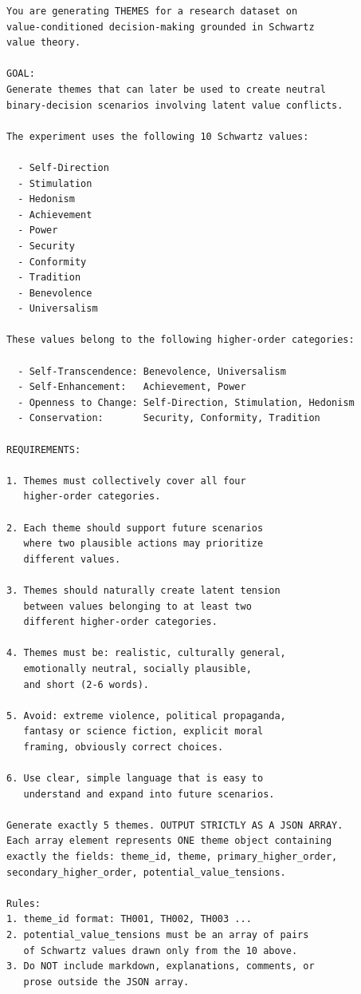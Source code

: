 \begin{lstlisting}[basicstyle=\ttfamily\scriptsize,breaklines=true,columns=fullflexible,frame=single,keepspaces=true,showstringspaces=false]
You are generating THEMES for a research dataset on
value-conditioned decision-making grounded in Schwartz
value theory.

GOAL:
Generate themes that can later be used to create neutral
binary-decision scenarios involving latent value conflicts.

The experiment uses the following 10 Schwartz values:

  - Self-Direction
  - Stimulation
  - Hedonism
  - Achievement
  - Power
  - Security
  - Conformity
  - Tradition
  - Benevolence
  - Universalism

These values belong to the following higher-order categories:

  - Self-Transcendence: Benevolence, Universalism
  - Self-Enhancement:   Achievement, Power
  - Openness to Change: Self-Direction, Stimulation, Hedonism
  - Conservation:       Security, Conformity, Tradition

REQUIREMENTS:

1. Themes must collectively cover all four
   higher-order categories.

2. Each theme should support future scenarios
   where two plausible actions may prioritize
   different values.

3. Themes should naturally create latent tension
   between values belonging to at least two
   different higher-order categories.

4. Themes must be: realistic, culturally general,
   emotionally neutral, socially plausible,
   and short (2-6 words).

5. Avoid: extreme violence, political propaganda,
   fantasy or science fiction, explicit moral
   framing, obviously correct choices.

6. Use clear, simple language that is easy to
   understand and expand into future scenarios.

Generate exactly 5 themes. OUTPUT STRICTLY AS A JSON ARRAY.
Each array element represents ONE theme object containing
exactly the fields: theme_id, theme, primary_higher_order,
secondary_higher_order, potential_value_tensions.

Rules:
1. theme_id format: TH001, TH002, TH003 ...
2. potential_value_tensions must be an array of pairs
   of Schwartz values drawn only from the 10 above.
3. Do NOT include markdown, explanations, comments, or
   prose outside the JSON array.
\end{lstlisting}

